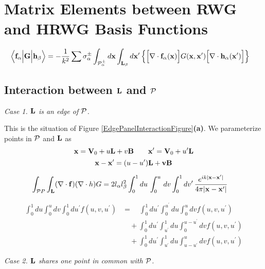\documentclass[letterpaper]{article}
\begin{document}
\newpage
\section{Matrix Elements between RWG and HRWG Basis Functions}

\begin{align*}
  \Big\langle \mathbf{f}_\alpha 
  \Big|       \mathbf{G}
  \Big|       \mathbf{h}_\beta 
  \Big\rangle
&= -\frac{1}{k^2}
   \sum \sigma_{\alpha}^{\pm}
   \int_{\mathcal{P}_\alpha^\pm} d\mathbf{x} 
   \int_{\mathbf{L}_\beta} d\mathbf{x}^\prime
   \left\{ \Big[\nabla \cdot \mathbf{f}_\alpha(\mathbf{x})\Big]
           G(\mathbf{x}, \mathbf{x}^\prime)
           \Big[\nabla \cdot \mathbf{h}_\alpha(\mathbf{x}^\prime)\Big]
   \right\}
\end{align*}

\subsection*{Interaction between $\mathbf{L}$ and $\mathcal{P}$}

\textit{Case 1. $\mathbf{L}$ is an edge of $\mathcal{P}$.}

This is the situation of 
Figure \ref{EdgePanelInteractionFigure}\textbf{(a)}.
We parameterize points in $\mathcal{P}$ and $\mathbf{L}$ as 
$$ \mathbf{x} = \mathbf{V}_0 + u\mathbf{L} + v\mathbf{B}
   \qquad
   \mathbf{x}^\prime = \mathbf{V}_0 + u^\prime \mathbf{L}
$$
$$ \mathbf{x} - \mathbf{x}^\prime = (u-u^\prime)\mathbf{L} + \mathbf{v}\mathbf{B}$$

\begin{align*}
  \int_{\mathcal{P}{P}}\int_{\mathbf{L}} (\nabla \cdot \mathbf{f}) (\nabla \cdot h) G 
&=
  2l_\alpha l_\beta^2 
  \int_0^1 du \, \int_0^u \, dv \int_0^1 dv^\prime \,
  \frac{e^{ik|\mathbf{x} - \mathbf{x}^\prime|}}{4\pi |\mathbf{x}- \mathbf{x}^\prime|}
\end{align*}

\begin{align*}
  \int_0^1 du \int_0^u dv \int_0^1 du^\prime f(u,v,u^\prime)
&=\quad 
  \int_0^1 du^\prime \int_0^{u^\prime} du \int_0^u dv 
  f(u,v,u^\prime)
\\
&\quad+ 
  \int_0^1 du^\prime \int_{u^\prime}^1 du \int_0^{u-u^\prime} dv 
  f(u,v,u^\prime)
\\
&\quad+ 
  \int_0^1 du^\prime \int_{u^\prime}^1 du \int_{u-u^\prime}^u dv 
  f(u,v,u^\prime)
\end{align*}

\textit{Case 2. $\mathbf{L}$ shares one point in common with $\mathcal{P}$.}
\end{document}
